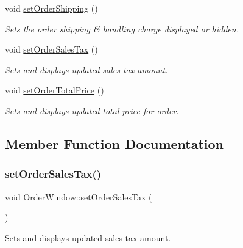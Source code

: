 \begin{DoxyCompactItemize}
void \mbox{\hyperlink{class_order_window_aa2a0cfb3003fd66954cc540dd9db23b8}{set\+Order\+Shipping}} ()
\begin{DoxyCompactList}\small\item\em Sets the order shipping \& handling charge displayed or hidden. \end{DoxyCompactList}\item 
void \mbox{\hyperlink{class_order_window_a6dfbb77a1a8911cc789062c6c00b7fe5}{set\+Order\+Sales\+Tax}} ()
\begin{DoxyCompactList}\small\item\em Sets and displays updated sales tax amount. \end{DoxyCompactList}\item 
void \mbox{\hyperlink{class_order_window_af1b6d198cf89a68c63afa28bc986786a}{set\+Order\+Total\+Price}} ()
\begin{DoxyCompactList}\small\item\em Sets and displays updated total price for order. \end{DoxyCompactList}\end{DoxyCompactItemize}


\subsection{Member Function Documentation}
\mbox{\label{class_order_window_a6dfbb77a1a8911cc789062c6c00b7fe5}} 
\subsubsection{\texorpdfstring{set\+Order\+Sales\+Tax()}{setOrderSalesTax()}}
{\footnotesize\ttfamily void Order\+Window\+::set\+Order\+Sales\+Tax (\begin{DoxyParamCaption}{ }\end{DoxyParamCaption})}



Sets and displays updated sales tax amount. 

